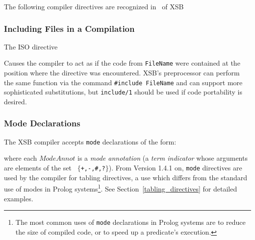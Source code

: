 The following compiler directives are recognized in \version\ of XSB

\subsubsection{Including Files in a Compilation}

\begin{description}


The ISO directive 


\noindent

Causes the compiler to act as if the code from {\tt FileName} were
contained at the position where the directive was encountered.  XSB's
preprocessor can perform the same function via the command
\verb|#include FileName| and can support more sophisticated
substitutions, but {\tt include/1} should be used if code portability
is desired.

\end{description}

%
\subsubsection{Mode Declarations}\label{mode_declarations}

The XSB compiler accepts {\tt mode} declarations of the form:


\noindent
where each $ModeAnnot$ is a {\em mode annotation\/} (a {\em term
indicator\/} whose arguments are elements of the set {\tt
$\{$+,-,\#,?$\}$}).  From Version 1.4.1 on, {\tt mode} directives are
used by the compiler for tabling directives, a use which differs from
the standard use of modes in Prolog systems\footnote{The most common
uses of {\tt mode} declarations in Prolog systems are to reduce the
size of compiled code, or to speed up a predicate's execution.}.  See
Section~\ref{tabling_directives} for detailed examples.


